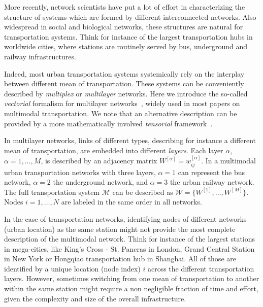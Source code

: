 More recently, network scientists have put a lot of effort in characterizing the structure of systems which are formed by different interconnected networks. Also widespread in social and biological networks, these structures are natural for transportation systems. Think for instance of the largest transportation hubs in worldwide cities, where stations are routinely served by bus, underground and railway infrastructures.

Indeed, most urban transportation systems systemically rely on the interplay between different mean of transportation. These systems can be conveniently described by \textit{multiplex} or \textit{multilayer} networks. Here we introduce the so-called \textit{vectorial} formalism for multilayer networks~\cite{boccaletti2014structure, battiston2014structural}, widely used in most papers on multimodal transportation. We note that an alternative description can be provided by a more mathematically involved \textit{tensorial} framework~\cite{dedomenico2013mathematical, kivela2014multilayer}.  

In multilayer networks, links of different types, describing for instance a different mean of transportation, are embedded into different \textit{layers}. Each layer $\alpha$, $\alpha = 1, \ldots, M$, is described by an adjacency matrix 
$ W^{[\alpha]} = w_{ij}^{[\alpha]}$. In a multimodal urban transportation networks with three layers, $\alpha=1$ can represent the bus network, $\alpha=2$ the underground network, and $\alpha=3$ the urban railway network. The full transportation system $\mathcal M$ can be described as $\mathcal W = \{W^{[1]}, \ldots,  W^{[M]}\}$. Nodes $i=1, \dots, N$ are labeled in the same order in all networks. 

In the case of transportation networks, identifying nodes of different networks (urban location) as the same station might not provide the most complete description of the multimodal network. Think for instance of the largest stations in mega-cities, like King's Cross - St. Pancras in London, Grand Central Station in New York or Hongqiao transportation hub in Shanghai. All of those are identified by a unique location (node index) $i$ across the different transportation layers. However, sometimes switching from one mean of transportation to another within the same station might require a non negligible fraction of time and effort, given the complexity and size of the overall infrastructure. 


